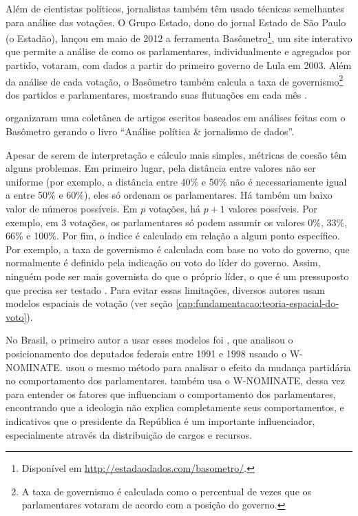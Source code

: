 Além de cientistas políticos, jornalistas também têm usado técnicas semelhantes
para análise das votações. O Grupo Estado, dono do jornal Estado de São Paulo
(o Estadão), lançou em maio de 2012 a ferramenta Basômetro\footnote{Disponível
em \url{http://estadaodados.com/basometro/}.}, um site interativo que permite a
análise de como os parlamentares, individualmente e agregados por partido,
votaram, com dados a partir do primeiro governo de Lula em 2003. Além da
análise de cada votação, o Basômetro também calcula a taxa de
governismo\footnote{A taxa de governismo é calculada como o percentual de vezes
que os parlamentares votaram de acordo com a posição do governo.} dos partidos
e parlamentares, mostrando suas flutuações em cada mês \cite{Estadao2012}.

 organizaram uma coletânea de artigos escritos baseados
em análises feitas com o Basômetro gerando o livro ``Análise política \&
jornalismo de dados''.

Apesar de serem de interpretação e cálculo mais simples, métricas de coesão têm
alguns problemas. Em primeiro lugar, pela distância entre valores não ser
uniforme (por exemplo, a distância entre 40\% e 50\% não é necessariamente
igual a entre 50\% e 60\%), eles só ordenam os parlamentares. Há também um
baixo valor de números possíveis. Em $p$ votações, há $p + 1$ valores
possíveis. Por exemplo, em 3 votações, os parlamentares só podem assumir os
valores 0\%, 33\%, 66\% e 100\%. Por fim, o índice é calculado em relação a
algum ponto específico. Por exemplo, a taxa de governismo é calculada com base
no voto do governo, que normalmente é definido pela indicação ou voto do líder
do governo. Assim, ninguém pode ser mais governista do que o próprio líder, o
que é um pressuposto que precisa ser testado
\cite{Poole2005,McCarty2011,Izumi2013}. Para evitar essas limitações, diversos
autores usam modelos espaciais de votação (ver seção
\ref{cap:fundamentacao:teoria-espacial-do-voto}).

No Brasil, o primeiro autor a usar esses modelos foi ,
que analisou o posicionamento dos deputados federais entre 1991 e 1998 usando o
W-NOMINATE.  usou o mesmo método para analisar o
efeito da mudança partidária no comportamento dos parlamentares.
 também usa o W-NOMINATE, dessa vez para entender os
fatores que influenciam o comportamento dos parlamentares, encontrando
que a ideologia não explica completamente seus comportamentos, e indicativos
que o presidente da República é um importante influenciador, especialmente
através da distribuição de cargos e recursos.

